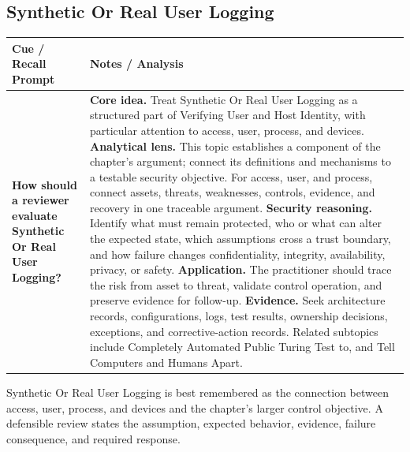 \documentclass[11pt]{article}
\newcommand{\CornellHeader}{%
\rowcolor{Navy}\color{white}\bfseries Cue / Recall Prompt & \color{white}\bfseries Notes / Analysis\\\hline}
\newcommand{\CornellRow}[2]{%
\cellcolor{CueGray}\RaggedRight\textbf{#1} & \RaggedRight #2\\\hline}
\begin{document}
\subsection*{Synthetic Or Real User Logging}
\begin{longtable}{>{\RaggedRight\arraybackslash}p{}|>{\RaggedRight\arraybackslash}p{}}
\CornellHeader
\CornellRow{How should a reviewer evaluate Synthetic Or Real User Logging?}{\textbf{Core idea.} Treat Synthetic Or Real User Logging as a structured part of Verifying User and Host Identity, with particular attention to access, user, process, and devices. \textbf{Analytical lens.} This topic establishes a component of the chapter's argument; connect its definitions and mechanisms to a testable security objective. For access, user, and process, connect assets, threats, weaknesses, controls, evidence, and recovery in one traceable argument. \textbf{Security reasoning.} Identify what must remain protected, who or what can alter the expected state, which assumptions cross a trust boundary, and how failure changes confidentiality, integrity, availability, privacy, or safety. \textbf{Application.} The practitioner should trace the risk from asset to threat, validate control operation, and preserve evidence for follow-up. \textbf{Evidence.} Seek architecture records, configurations, logs, test results, ownership decisions, exceptions, and corrective-action records. Related subtopics include Completely Automated Public Turing Test to, and Tell Computers and Humans Apart.}
\end{longtable}
\begin{topicsummary}
Synthetic Or Real User Logging is best remembered as the connection between access, user, process, and devices and the chapter's larger control objective. A defensible review states the assumption, expected behavior, evidence, failure consequence, and required response.
\end{topicsummary}
\end{document}
